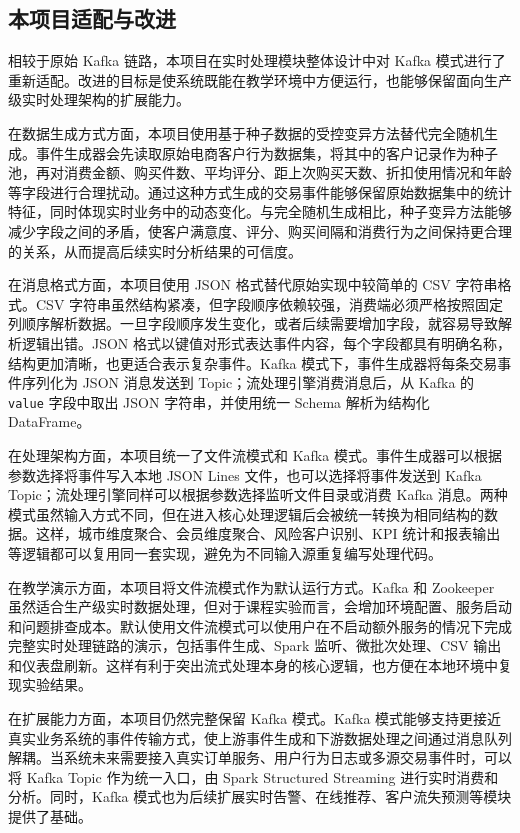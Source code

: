\documentclass[12pt,hyperref,a4paper,UTF8]{ctexart}
\begin{document}
\subsection{本项目适配与改进}

相较于原始 Kafka 链路，本项目在实时处理模块整体设计中对 Kafka 模式进行了重新适配。改进的目标是使系统既能在教学环境中方便运行，也能够保留面向生产级实时处理架构的扩展能力。

在数据生成方式方面，本项目使用基于种子数据的受控变异方法替代完全随机生成。事件生成器会先读取原始电商客户行为数据集，将其中的客户记录作为种子池，再对消费金额、购买件数、平均评分、距上次购买天数、折扣使用情况和年龄等字段进行合理扰动。通过这种方式生成的交易事件能够保留原始数据集中的统计特征，同时体现实时业务中的动态变化。与完全随机生成相比，种子变异方法能够减少字段之间的矛盾，使客户满意度、评分、购买间隔和消费行为之间保持更合理的关系，从而提高后续实时分析结果的可信度。

在消息格式方面，本项目使用 JSON 格式替代原始实现中较简单的 CSV 字符串格式。CSV 字符串虽然结构紧凑，但字段顺序依赖较强，消费端必须严格按照固定列顺序解析数据。一旦字段顺序发生变化，或者后续需要增加字段，就容易导致解析逻辑出错。JSON 格式以键值对形式表达事件内容，每个字段都具有明确名称，结构更加清晰，也更适合表示复杂事件。Kafka 模式下，事件生成器将每条交易事件序列化为 JSON 消息发送到 Topic；流处理引擎消费消息后，从 Kafka 的 \texttt{value} 字段中取出 JSON 字符串，并使用统一 Schema 解析为结构化 DataFrame。

在处理架构方面，本项目统一了文件流模式和 Kafka 模式。事件生成器可以根据参数选择将事件写入本地 JSON Lines 文件，也可以选择将事件发送到 Kafka Topic；流处理引擎同样可以根据参数选择监听文件目录或消费 Kafka 消息。两种模式虽然输入方式不同，但在进入核心处理逻辑后会被统一转换为相同结构的数据。这样，城市维度聚合、会员维度聚合、风险客户识别、KPI 统计和报表输出等逻辑都可以复用同一套实现，避免为不同输入源重复编写处理代码。

在教学演示方面，本项目将文件流模式作为默认运行方式。Kafka 和 Zookeeper 虽然适合生产级实时数据处理，但对于课程实验而言，会增加环境配置、服务启动和问题排查成本。默认使用文件流模式可以使用户在不启动额外服务的情况下完成完整实时处理链路的演示，包括事件生成、Spark 监听、微批次处理、CSV 输出和仪表盘刷新。这样有利于突出流式处理本身的核心逻辑，也方便在本地环境中复现实验结果。

在扩展能力方面，本项目仍然完整保留 Kafka 模式。Kafka 模式能够支持更接近真实业务系统的事件传输方式，使上游事件生成和下游数据处理之间通过消息队列解耦。当系统未来需要接入真实订单服务、用户行为日志或多源交易事件时，可以将 Kafka Topic 作为统一入口，由 Spark Structured Streaming 进行实时消费和分析。同时，Kafka 模式也为后续扩展实时告警、在线推荐、客户流失预测等模块提供了基础。
\end{document}

